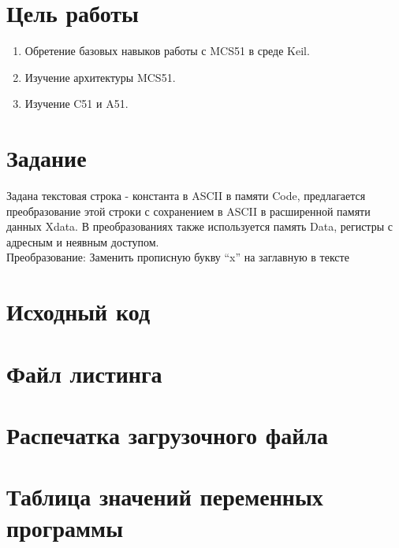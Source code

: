 

\def \labnum {1}
\def \labsubj {Организация ЭВМ и систем}
\def \labauthor {Айтуганов Д. А. \\ Чебыкин И. Б.}
\def \labgroup {P3301}
\def \labinsp {Скорубский В. И.}
\def \labname {}

\isnametrue
\lstset{  
	caption=\lstname,
	basicstyle=\ttfamily\selectfont\scriptsize
}


\section*{Цель работы}
\begin{enumerate}
	\item Обретение базовых навыков работы с MCS51 в среде Keil.
	\item Изучение архитектуры MCS51.
	\item Изучение C51 и A51.
\end{enumerate}
\section*{Задание}
Задана текстовая строка - константа в ASCII в памяти Code, предлагается преобразование этой строки с сохранением в ASCII в расширенной памяти данных Xdata.
В преобразованиях также используется память Data, регистры с адресным и неявным доступом. \\
Преобразование: Заменить прописную букву “x” на заглавную в тексте 
\section*{Исходный код}


\section*{Файл листинга}


\section*{Распечатка загрузочного файла}


\section*{Таблица значений переменных программы}

